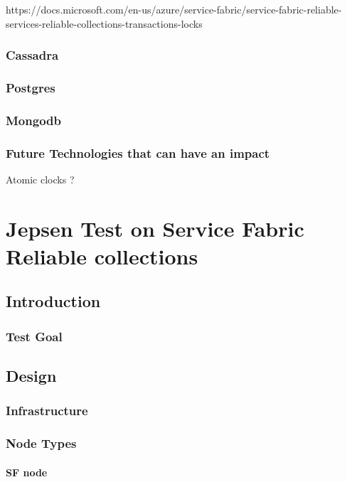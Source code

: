 \documentclass[a4paper,10pt,titlepage]{report}
\begin{document}
https://docs.microsoft.com/en-us/azure/service-fabric/service-fabric-reliable-services-reliable-collections-transactions-locks

\subsection{Cassadra}

\subsection{Postgres}

\subsection{Mongodb}

\subsection{Future Technologies that can have an impact}
 Atomic clocks ?    




\chapter{Jepsen Test on Service Fabric Reliable collections}

\section{Introduction}



\subsection{Test Goal}


\section{Design}

\subsection{Infrastructure}

\subsection{Node Types}

\subsubsection{SF node}
\end{document}
